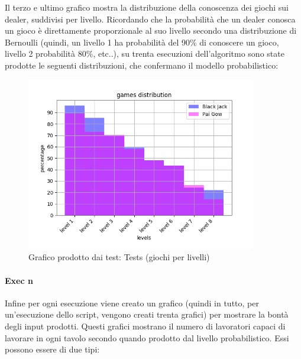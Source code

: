     \FloatBarrier
    \noindent
    Il terzo e ultimo grafico mostra la distribuzione della conoscenza dei giochi sui dealer, suddivisi per livello. Ricordando che la probabilità che un dealer conosca un gioco è direttamente proporzionale al suo livello secondo una distribuzione di Bernoulli (quindi, un livello 1 ha probabilità del 90\% di conoscere un gioco, livello 2 probabilità 80\%, etc..), su trenta esecuzioni dell’algoritmo sono state prodotte le seguenti distribuzioni, che confermano il modello probabilistico:
    \begin{figure}[!h]
        \centering
        \includegraphics[width=0.9\textwidth,keepaspectratio]{../immagini/distr_games.png}
        \caption{Grafico prodotto dai test: Tests (giochi per livelli)}
    \end{figure}
    \FloatBarrier
    \noindent
    
    \paragraph{Exec n} Infine per ogni esecuzione viene creato un grafico (quindi in tutto, per un'esecuzione dello script, vengono creati trenta grafici) per mostrare la bontà degli input prodotti. Questi grafici mostrano il numero di lavoratori capaci di lavorare in ogni tavolo secondo quando prodotto dal livello probabilistico. Essi possono essere di due tipi:
    
